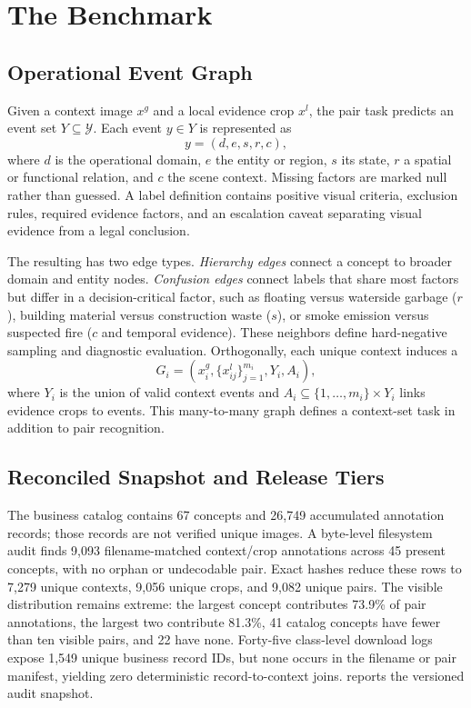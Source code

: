 \section{The \dataset Benchmark}
\label{sec:dataset}

\subsection{Operational Event Graph}

Given a context image $x^g$ and a local evidence crop $x^l$, the pair task predicts an event set $Y\subseteq\mathcal{Y}$. Each event $y\in Y$ is represented as
\begin{equation}
  y=(d,e,s,r,c),
\end{equation}
where $d$ is the operational domain, $e$ the entity or region, $s$ its state, $r$ a spatial or functional relation, and $c$ the scene context. Missing factors are marked null rather than guessed. A label definition contains positive visual criteria, exclusion rules, required evidence factors, and an escalation caveat separating visual evidence from a legal conclusion.

The resulting \eventgraph has two edge types. \emph{Hierarchy edges} connect a concept to broader domain and entity nodes. \emph{Confusion edges} connect labels that share most factors but differ in a decision-critical factor, such as floating versus waterside garbage ($r$), building material versus construction waste ($s$), or smoke emission versus suspected fire ($c$ and temporal evidence). These neighbors define hard-negative sampling and diagnostic evaluation. Orthogonally, each unique context induces a \samplegraph
\begin{equation}
  G_i=\left(x_i^g,\{x_{ij}^l\}_{j=1}^{m_i},Y_i,A_i\right),
\end{equation}
where $Y_i$ is the union of valid context events and $A_i\subseteq\{1,\ldots,m_i\}\times Y_i$ links evidence crops to events. This many-to-many graph defines a context-set task in addition to pair recognition.

\subsection{Reconciled Snapshot and Release Tiers}

The business catalog contains 67 concepts and 26,749 accumulated annotation records; those records are not verified unique images. A byte-level filesystem audit finds 9,093 filename-matched context/crop annotations across 45 present concepts, with no orphan or undecodable pair. Exact hashes reduce these rows to 7,279 unique contexts, 9,056 unique crops, and 9,082 unique pairs. The visible distribution remains extreme: the largest concept contributes 73.9\% of pair annotations, the largest two contribute 81.3\%, 41 catalog concepts have fewer than ten visible pairs, and 22 have none. Forty-five class-level download logs expose 1,549 unique business record IDs, but none occurs in the filename or pair manifest, yielding zero deterministic record-to-context joins.  reports the versioned audit snapshot.

